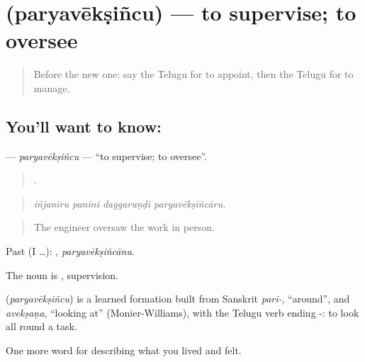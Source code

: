 \section[\texorpdfstring{\te{పర్యవేక్షించు} (paryavēkṣiñcu)}{పర్యవేక్షించు (paryavēkṣiñcu)}]{ (paryavēkṣiñcu) — to supervise; to oversee}

\label{lesson:TE-C526-paryaveksincu}



\begin{quote}
Before the new one: say the Telugu for to appoint, then the Telugu for to manage.
\end{quote}

\subsection*{You'll want to know: }
\textbf{} — \emph{paryavēkṣiñcu} — \textquotedblleft{}to supervise; to oversee\textquotedblright{}.

\begin{quote}
   .
\end{quote}

\begin{quote}
\emph{iñjanīru panini daggaruṇḍi paryavēkṣiñcāru.}
\end{quote}

\begin{quote}
The engineer oversaw the work in person.
\end{quote}

Past (I …): , \emph{paryavēkṣiñcānu}.

The noun is , supervision.

\begin{cousinweb}
\textbf{} (\emph{paryavēkṣiñcu}) is a learned formation built from Sanskrit \emph{pari-}, \textquotedblleft{}around\textquotedblright{}, and \emph{avekṣaṇa}, \textquotedblleft{}looking at\textquotedblright{} (Monier-Williams), with the Telugu verb ending -: to look all round a task.
\end{cousinweb}

\begin{grammarlens}[title={What you've built}]
One more word for describing what you lived and felt.
\end{grammarlens}

